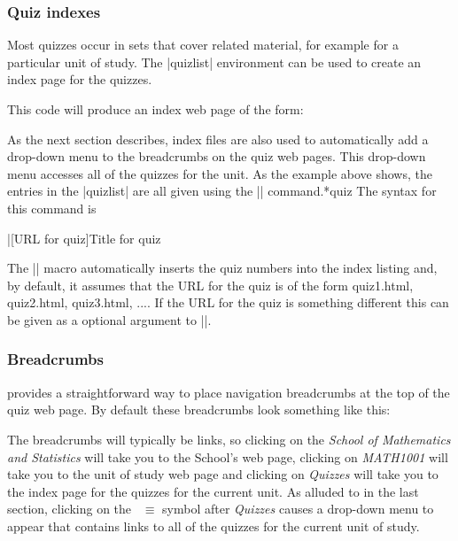 \documentclass[svgnames]{article}
\begin{document}
  \subsubsection{Quiz indexes}


  Most quizzes occur in sets that cover related material, for example
  for a particular unit of study. The \LatexCode|quizlist| environment can be
  used to create an index page for the quizzes.


  This code will produce an index web page of the form:


  As the next section describes, index files are also used to
  automatically add a drop-down menu to the breadcrumbs on the quiz web
  pages. This drop-down menu accesses all of the quizzes for the unit.
  As the example above shows, the entries in the \LatexCode|quizlist| are all
  given using the \LatexCode|\quiz| command.*{quiz} The syntax for this command is

  \begin{latexcode}
      \quiz|[URL for quiz]{Title for quiz}
  \end{latexcode}

  \noindent
  The \LatexCode|\quiz| macro automatically inserts the quiz numbers
  into the index listing and, by default, it assumes that the URL for the quiz
  is of the form \textsf{quiz1.html}, \textsf{quiz2.html},
  \textsf{quiz3.html}, .... If the URL for the quiz is something
  different this can be given as a optional argument to \LatexCode|\quiz|.

  \subsubsection{Breadcrumbs}\label{SS:breadcrumbs}

  \WebQuiz provides a straightforward way to place navigation breadcrumbs
  at the top of the quiz web page. By default these
  breadcrumbs look something like this:


  \noindent
  The breadcrumbs will typically be links, so clicking on the
  \textit{School of Mathematics and Statistics} will take you to the
  School's web page, clicking on \textit{MATH1001} will take you to the
  unit of study web page and clicking on \textit{Quizzes} will take you
  to the index page for the quizzes for the current unit. As alluded to
  in the last section, clicking on the~{\large\color{red} $\equiv$} symbol after
  \textit{Quizzes} causes a drop-down menu to appear that
  contains links to all of the quizzes for the current unit of study.
\end{document}
